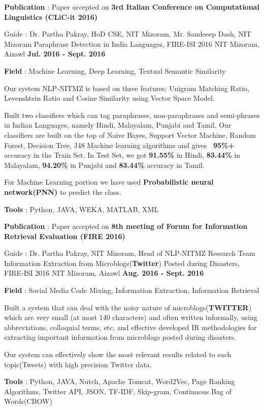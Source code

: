 \begin{cventries}
{\begin{cvitems}
        \item{\textbf{Publication} : Paper accepted on \textbf{3rd Italian Conference on Computational Linguistics (CLiC-it 2016)} }
      \end{cvitems}
    }
  \cventry
    {Guide : Dr. Partha Pakray, HoD CSE, NIT Mizoram, Mr. Sandeeep Dash, NIT Mizoram}
    {Paraphrase Detection in India Languages, FIRE-ISI 2016}
    {NIT Mizoram, Aizawl}
    {\textbf{Jul. 2016 - Sept. 2016}}
    {
      \begin{cvitems}
      \item{\textbf{Field} : Machine Learning, Deep Learning, Textual Semantic Similarity}
        \item {Our system  NLP-NITMZ is based on three features: Unigram Matching Ratio, Levenshtein Ratio and Cosine Similarity using Vector Space Model.}
        \item {Built two classifiers which can tag paraphrases, non-paraphrases and semi-phrases in Indian Languages,
namely Hindi, Malayalam, Punjabi and Tamil. Our classifiers are built on the top of Naive Bayes, Support Vector Machine,
Random Forest, Decision Tree, J48 Machine learning algorithms and gives \textbf{~95\%+} accuracy in the Train Set. In Test Set, we got \textbf{91.55\%} in Hindi, \textbf{83.44\%} in Malayalam, \textbf{94.20\%} in Punjabi and \textbf{83.44\%} accuracy in Tamil.}
    \item{For Machine Learning portion we have used \textbf{Probabilistic neural network(PNN)} to predict the class.}
    \item{\textbf{Tools} : Python, JAVA, WEKA, MATLAB, XML}
    \item{\textbf{Publication} : Paper accepted on \textbf{8th meeting of Forum for Information Retrieval Evaluation (FIRE 2016) }}
      \end{cvitems}
    }
  \cventry
    {Guide : Dr. Partha Pakray, NIT Mizoram, Head of NLP-NITMZ Research Team}
    {Information Extraction from Microblogs(\textbf{Twitter}) Posted during Disasters, FIRE-ISI 2016}
    {NIT Mizoram, Aizawl}
    {\textbf{Aug. 2016 - Sept. 2016}}
    {
      \begin{cvitems}
        \item{\textbf{Field} : Social Media Code Mixing, Information Extraction, Information Retrieval}
        \item{Built a system that can deal with the noisy nature of microblogs(\textbf{TWITTER}) which are very small (at most 140 characters) and often written informally, using abbreviations, colloquial terms, etc, and
effective developed IR methodologies for extracting important information from microblogs posted during disasters.}
        \item{Our system can effectively show the most relevant results related to each topic(Tweets) with high precision Twitter data.}
        \item{\textbf{Tools} : Python, JAVA, Nutch, Apache Tomcat, Word2Vec, Page Ranking Algorithms, Twitter API, JSON, TF-IDF, Skip-gram, Continuous Bag of Words(CBOW)}
      \end{cvitems}
    }
\end{cventries}

